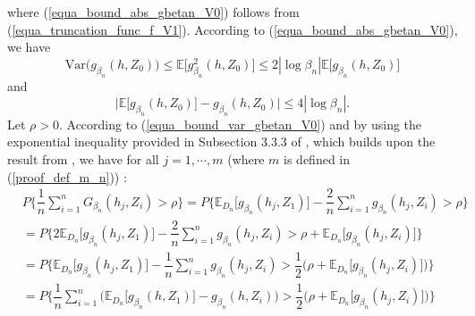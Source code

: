 \documentclass[10pt,twoside]{article}
\numberwithin{equation}{section}
\newcommand{\E}{\ensuremath{\mathbb{E}}}
\newcommand{\var}{\ensuremath{\mathrm{Var}}}
\begin{document}
%
where (\ref{equa_bound_abs_gbetan_V0}) follows from (\ref{equa_truncation_func_f_V1}). According to (\ref{equa_bound_abs_gbetan_V0}), we have
%
\begin{equation}\label{equa_bound_var_gbetan_V0}
    \var \big(g_{\beta_n}(h, Z_0) \big) \leq \E\big[g_{\beta_n}^2(h, Z_0)\big] \leq 2|\log \beta_n| \E\big[g_{\beta_n}(h, Z_0)\big]  
\end{equation}
%
and
\begin{equation}\label{equa_bound_abs_moy_gbetan}
    \Big|\E\big[g_{\beta_n}(h, Z_0)\big] - g_{\beta_n}(h, Z_0)\Big| \leq 4|\log \beta_n|. 
\end{equation}
%
Let $\rho > 0$. According to (\ref{equa_bound_var_gbetan_V0}) and by using the exponential inequality provided in Subsection 3.3.3 of \cite{hang2016learning}, which builds upon the result from \cite{merlevede2009bernstein},
%
we have for all $j=1,\cdots,m$ (where $m$ is defined in (\ref{proof_def_m_n})) :
%
\begin{align*} 
\nonumber &  P\Bigg\{\dfrac{1}{n} \sum_{i=1}^n  G_{\beta_n}(h_j, Z_i) > \rho \Bigg\}  =  P\Bigg\{ \E_{D_n}\big[g_{\beta_n}(h_j, Z_1)\big] - \dfrac{2}{n} \sum_{i=1}^n g_{\beta_n}(h_j, Z_i) > \rho \Bigg\}
\\
 \nonumber & =  P\Bigg\{ 2\E_{D_n}\big[g_{\beta_n}(h_j, Z_1)\big] - \dfrac{2}{n} \sum_{i=1}^n g_{\beta_n}(h_j, Z_i) > \rho + \E_{D_n}\big[g_{\beta_n}(h_j, Z_i)\big] \Bigg\}
 \\
 \nonumber & =  P\Bigg\{\E_{D_n}\big[g_{\beta_n}(h_j, Z_1)\big] - \dfrac{1}{n} \sum_{i=1}^n g_{\beta_n}(h_j, Z_i) > \dfrac{1}{2} \big(\rho + \E_{D_n}\big[g_{\beta_n}(h_j, Z_i)\big] \big) \Bigg\}
  \\
  \nonumber & =   P\Bigg\{\dfrac{1}{n} \sum_{i=1}^n \Big(\E_{D_n}\big[g_{\beta_n}(h, Z_1)\big] - g_{\beta_n}(h, Z_i) \Big)  > \dfrac{1}{2} \big(\rho + \E_{D_n}\big[g_{\beta_n}(h_j, Z_i)\big] \big) \Bigg\}
\end{align*}
%
%
\end{document}
